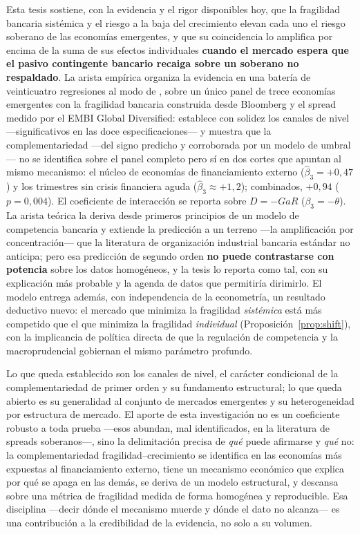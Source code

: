 Esta tesis sostiene, con la evidencia y el rigor disponibles hoy, que la fragilidad bancaria sistémica y el riesgo a la baja del crecimiento elevan cada uno el riesgo soberano de las economías emergentes, y que su coincidencia lo amplifica por encima de la suma de sus efectos individuales \textbf{cuando el mercado espera que el pasivo contingente bancario recaiga sobre un soberano no respaldado}. La arista empírica organiza la evidencia en una batería de veinticuatro regresiones al modo de \citet{Chari2024}, sobre un único panel de trece economías emergentes con la fragilidad bancaria construida desde Bloomberg y el spread medido por el EMBI Global Diversified: establece con solidez los canales de nivel —significativos en las doce especificaciones— y muestra que la complementariedad —del signo predicho y corroborada por un modelo de umbral— no se identifica sobre el panel completo pero sí en dos cortes que apuntan al mismo mecanismo: el núcleo de economías de financiamiento externo ($\hat\beta_3=+0{,}47$) y los trimestres sin crisis financiera aguda ($\hat\beta_3\approx+1{,}2$); combinados, $+0{,}94$ ($p=0{,}004$). El coeficiente de interacción se reporta sobre $D=-GaR$ ($\beta_3=-\theta$). La arista teórica la deriva desde primeros principios de un modelo de competencia bancaria y extiende la predicción a un terreno —la amplificación por concentración— que la literatura de organización industrial bancaria estándar no anticipa; pero esa predicción de segundo orden \textbf{no puede contrastarse con potencia} sobre los datos homogéneos, y la tesis lo reporta como tal, con su explicación más probable y la agenda de datos que permitiría dirimirlo. El modelo entrega además, con independencia de la econometría, un resultado deductivo nuevo: el mercado que minimiza la fragilidad \emph{sistémica} está más competido que el que minimiza la fragilidad \emph{individual} (Proposición~\ref{prop:shift}), con la implicancia de política directa de que la regulación de competencia y la macroprudencial gobiernan el mismo parámetro profundo.

Lo que queda establecido son los canales de nivel, el carácter condicional de la complementariedad de primer orden y su fundamento estructural; lo que queda abierto es su generalidad al conjunto de mercados emergentes y su heterogeneidad por estructura de mercado. El aporte de esta investigación no es un coeficiente robusto a toda prueba —esos abundan, mal identificados, en la literatura de spreads soberanos—, sino la delimitación precisa de \emph{qué} puede afirmarse y \emph{qué} no: la complementariedad fragilidad--crecimiento se identifica en las economías más expuestas al financiamiento externo, tiene un mecanismo económico que explica por qué se apaga en las demás, se deriva de un modelo estructural, y descansa sobre una métrica de fragilidad medida de forma homogénea y reproducible. Esa disciplina —decir dónde el mecanismo muerde y dónde el dato no alcanza— es una contribución a la credibilidad de la evidencia, no solo a su volumen.
